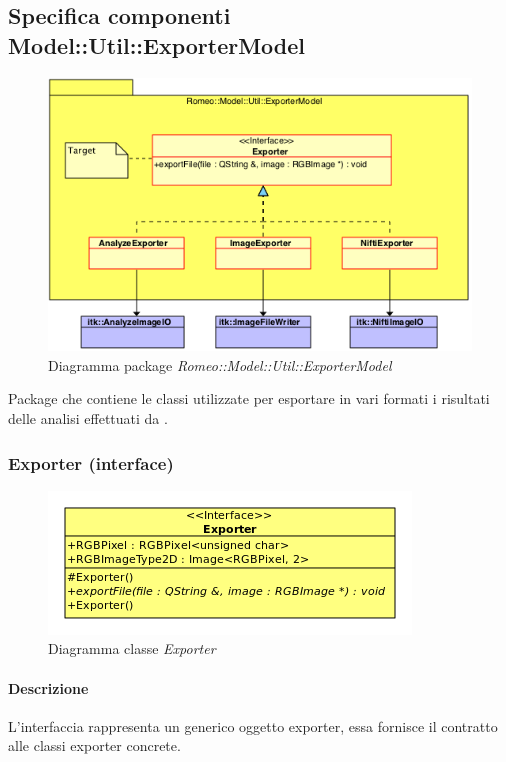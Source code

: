 \subsection{Specifica componenti Model::Util::ExporterModel}
\label{specificaExporterModel}
\begin{figure}[!h]
\centering
\includegraphics[scale=0.8]{../Specifica_Tecnica/Content/Immagini/Romeo__Model__Util__ExporterModel.png}
			\caption{Diagramma package \textsl{Romeo::Model::Util::ExporterModel}}
			\label{comp_romeo::model::util::exporterrmodel}
\end{figure}
Package\g{} che contiene le classi utilizzate per esportare in vari formati i risultati delle analisi effettuati da \project.

\pagebreak
\subsubsection{Exporter (interface)}
\label{spexporter}
\begin{figure}[!h]
\centering
\includegraphics[scale=5]{./Content/Immagini/model/Exporter.png}
			\caption{Diagramma classe \textsl{Exporter}}
			\label{cl_exporter}
\end{figure}
\paragraph{Descrizione \\}
L'interfaccia rappresenta un generico oggetto exporter, essa fornisce il contratto alle classi exporter concrete.
